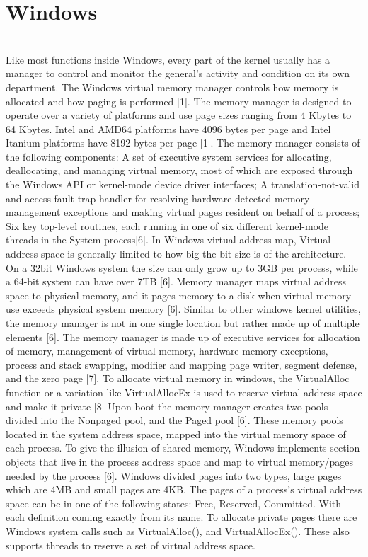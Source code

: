 \documentclass[10pt,draftclsnofoot,peerreview,letterpaper,onecolumn,]{IEEEtran}
\begin{document}
\section{Windows}
~\\Like most functions inside Windows, every part of the kernel usually has a manager to control and monitor the general’s activity and condition on its own department. The Windows virtual memory manager controls how memory is allocated and how paging is performed [1]. The memory manager is designed to operate over a variety of platforms and use page sizes ranging from 4 Kbytes to 64 Kbytes. Intel and AMD64 platforms have 4096 bytes per page and Intel Itanium platforms have 8192 bytes per page [1]. The memory manager consists of the following components: A set of executive system services for allocating, deallocating, and managing virtual memory, most of which are exposed through the Windows API or kernel-mode device driver interfaces; A translation-not-valid and access fault trap handler for resolving hardware-detected memory management exceptions and making virtual pages resident on behalf of a process; Six key top-level routines, each running in one of six different kernel-mode threads in the System process[6].
In Windows virtual address map, Virtual address space is generally limited to how big the bit size is of the architecture. On a 32bit Windows system the size can only grow up to 3GB per process, while a 64-bit system can have over 7TB [6]. Memory manager maps virtual address space to physical memory, and it pages memory to a disk when virtual memory use exceeds physical system memory [6]. Similar to other windows kernel utilities, the memory manager is not in one single location but rather made up of multiple elements [6]. The memory manager is made up of executive services for allocation of memory, management of virtual memory, hardware memory exceptions, process and stack swapping, modifier and mapping page writer, segment defense, and the zero page [7]. To allocate virtual memory in windows, the VirtualAlloc function or a variation like VirtualAllocEx is used to reserve virtual address space and make it private [8]
Upon boot the memory manager creates two pools divided into the Nonpaged pool, and the Paged pool [6]. These memory pools located in the system address space, mapped into the virtual memory space of each process.
To give the illusion of shared memory, Windows implements section objects that live in the process address space and map to virtual memory/pages needed by the process [6]. Windows divided pages into two types, large pages which are 4MB and small pages are 4KB. The pages of a process’s virtual address space can be in one of the following states: Free, Reserved, Committed. With each definition coming exactly from its name. To allocate private pages there are Windows system calls such as VirtualAlloc(), and VirtualAllocEx(). These also supports threads to reserve a set of virtual address space.
\end{document}
